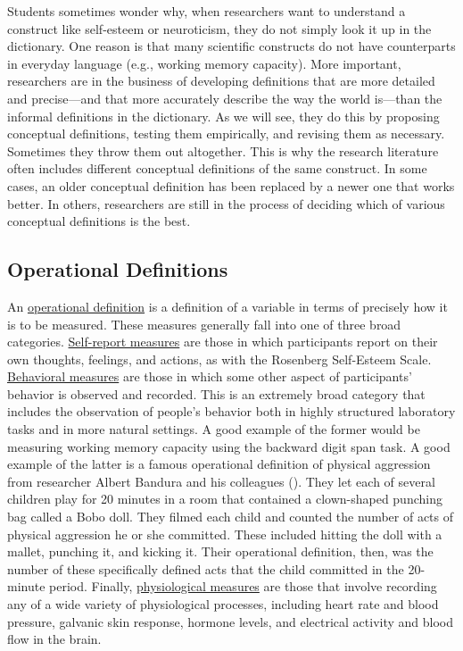 \documentclass[
]{krantz}
\begin{document}
Students sometimes wonder why, when researchers want to understand a construct like self-esteem or neuroticism, they do not simply look it up in the dictionary. One reason is that many scientific constructs do not have counterparts in everyday language (e.g., working memory capacity). More important, researchers are in the business of developing definitions that are more detailed and precise---and that more accurately describe the way the world is---than the informal definitions in the dictionary. As we will see, they do this by proposing conceptual definitions, testing them empirically, and revising them as necessary. Sometimes they throw them out altogether. This is why the research literature often includes different conceptual definitions of the same construct. In some cases, an older conceptual definition has been replaced by a newer one that works better. In others, researchers are still in the process of deciding which of various conceptual definitions is the best.

\subsection*{Operational Definitions}\label{operational-definitions}


An \hyperref[operational-definition]{operational definition} is a definition of a variable in terms of precisely how it is to be measured. These measures generally fall into one of three broad categories. \hyperref[self-report-measure]{Self-report measures} are those in which participants report on their own thoughts, feelings, and actions, as with the Rosenberg Self-Esteem Scale. \hyperref[behavioral-measure]{Behavioral measures} are those in which some other aspect of participants' behavior is observed and recorded. This is an extremely broad category that includes the observation of people's behavior both in highly structured laboratory tasks and in more natural settings. A good example of the former would be measuring working memory capacity using the backward digit span task. A good example of the latter is a famous operational definition of physical aggression from researcher Albert Bandura and his colleagues (). They let each of several children play for 20 minutes in a room that contained a clown-shaped punching bag called a Bobo doll. They filmed each child and counted the number of acts of physical aggression he or she committed. These included hitting the doll with a mallet, punching it, and kicking it. Their operational definition, then, was the number of these specifically defined acts that the child committed in the 20-minute period. Finally, \hyperref[physiological-measure]{physiological measures} are those that involve recording any of a wide variety of physiological processes, including heart rate and blood pressure, galvanic skin response, hormone levels, and electrical activity and blood flow in the brain.
\end{document}
